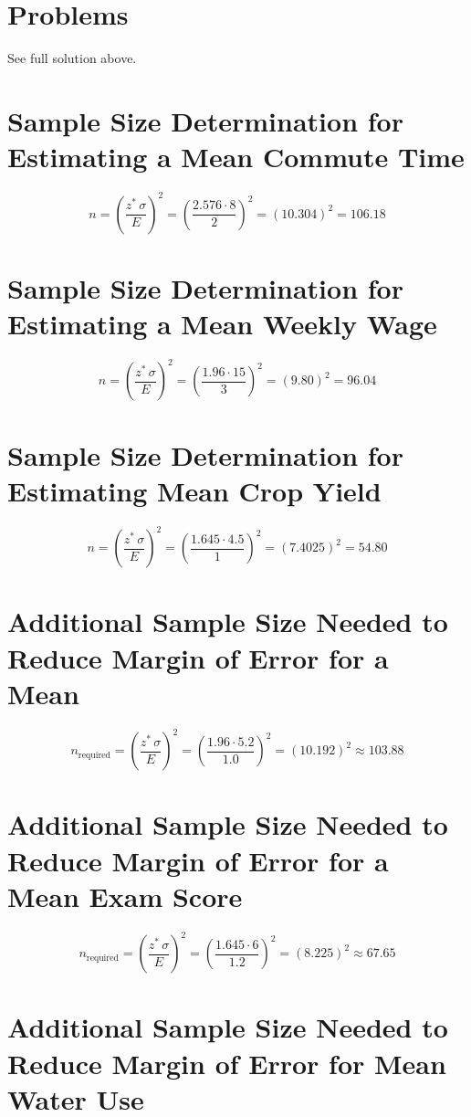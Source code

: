 \section*{Problems}
See full solution above.

\section*{Sample Size Determination for Estimating a Mean Commute Time}
\[n = \left(\frac{z^*\,\sigma}{E}\right)^2
		= \left(\frac{2.576 \cdot 8}{2}\right)^2
		= \left(10.304\right)^2
		= 106.18\]

\section*{Sample Size Determination for Estimating a Mean Weekly Wage}
\[n = \left(\frac{z^*\,\sigma}{E}\right)^2
		= \left(\frac{1.96 \cdot 15}{3}\right)^2
		= \left(9.80\right)^2
		= 96.04\]

\section*{Sample Size Determination for Estimating Mean Crop Yield}
\[n = \left(\frac{z^*\,\sigma}{E}\right)^2
		= \left(\frac{1.645 \cdot 4.5}{1}\right)^2
		= \left(7.4025\right)^2
		= 54.80\]

\section*{Additional Sample Size Needed to Reduce Margin of Error for a Mean}
\[n_{\text{required}} = \left(\frac{z^*\,\sigma}{E}\right)^2
		= \left(\frac{1.96 \cdot 5.2}{1.0}\right)^2
		= \left(10.192\right)^2
		\approx 103.88\]

\section*{Additional Sample Size Needed to Reduce Margin of Error for a Mean Exam Score}
\[n_{\text{required}} = \left(\frac{z^*\,\sigma}{E}\right)^2
		= \left(\frac{1.645 \cdot 6}{1.2}\right)^2
		= \left(8.225\right)^2
		\approx 67.65\]

\section*{Additional Sample Size Needed to Reduce Margin of Error for Mean Water Use}



